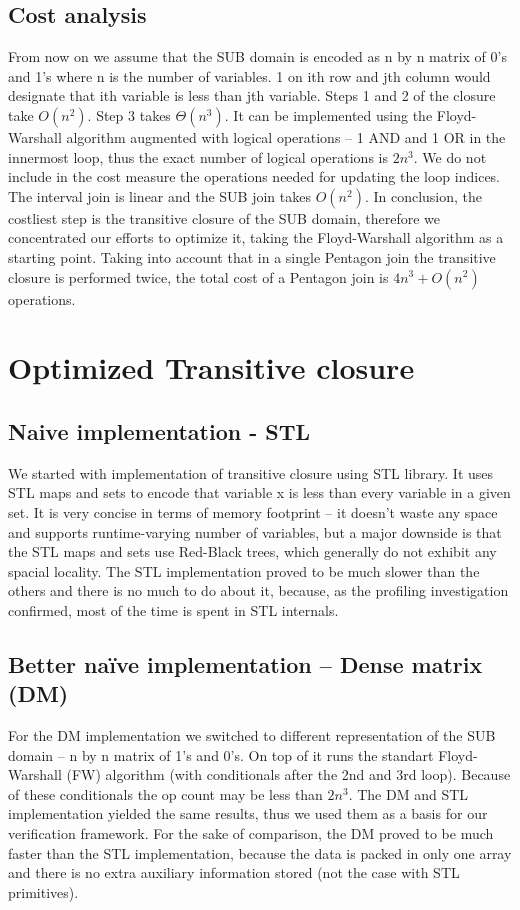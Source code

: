 \documentclass[letterpaper]{article}
\begin{document}
\subsection{Cost analysis}
From now on we assume that the SUB domain is encoded as n by n matrix of 0's and 1's 
where n is the number of variables. 1 on ith row and jth column would designate 
that ith variable is less than jth variable. Steps 1 and 2 of the closure 
take \(O(n^2)\). Step 3 takes \(\Theta(n^3)\). It can be implemented using the Floyd-Warshall 
algorithm \cite{Floyd1962} augmented with logical operations – 1 AND and 1 OR in the innermost 
loop, thus the exact number of logical operations is \(2n^3\). We do not include in the cost measure
the operations needed for updating the loop indices. The interval join is 
linear and the SUB join takes \(O(n^2)\). In conclusion, the costliest step is 
the transitive closure of the SUB domain, therefore we concentrated our efforts 
to optimize it, taking the Floyd-Warshall algorithm as a starting point. 
Taking into account that in a single Pentagon join the transitive closure is 
performed twice, the total cost of a Pentagon join is \(4n^3 + O(n^2)\) operations.


\section{Optimized Transitive closure}\label{sec:yourmethod}


\subsection{Naive implementation - STL}
We started with implementation of transitive closure using STL library. 
It uses STL maps and sets to encode that variable x is less than every 
variable in a given set. It is very concise in terms of memory 
footprint -- it doesn't waste any space and supports runtime-varying 
number of variables, but a major downside is that the STL maps and sets 
use Red-Black trees, which generally do not exhibit any spacial locality. 
The STL implementation proved to be much slower than the others and there 
is no much to do about it, because, as the profiling investigation 
confirmed, most of the time is spent in STL internals.

\subsection{Better na\"ive implementation – Dense matrix (DM)}
For the DM implementation we switched to different representation of the 
SUB domain – n by n matrix of 1's and 0's. On top of it runs the standart 
Floyd-Warshall (FW) algorithm (with conditionals after the 2nd and 3rd loop). 
Because of these conditionals the op count may be less than \(2n^3\). The DM 
and STL implementation yielded the same results, thus we used them as a 
basis for our verification framework. For the sake of comparison, the DM 
proved to be much faster than the STL implementation, because the data is 
packed in only one array and there is no extra auxiliary information stored (not the case with STL primitives).
\end{document}
